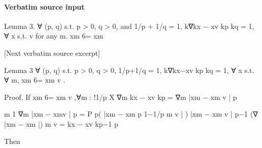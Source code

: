 \documentclass[10pt]{article}
\begin{document}
\paragraph{Verbatim source input}
\begin{ReviewVerbatim}
Lemma 3. ∀ (p, q) s.t. p > 0, q > 0, and 1/p + 1/q = 1, k∇kx − xv kp kq = 1, ∀ x s.t.
       v for any m.
xm 6= xm

[Next verbatim source excerpt]

Lemma 3 ∀ (p, q) s.t. p > 0, q > 0, 1/p+1/q = 1, k∇kx−xv kp kq = 1, ∀ x s.t. ∀ m, xm 6= xm
                                                                                         v .

Proof. If xm 6= xm
                 v ,∀m :
                                                                                  !1/p
                                                              X
                          ∇m kx − xv kp = ∇m                       |xm − xm
                                                                          v |
                                                                             p

                                                               m
                                                   1    ∇m |xm − xmv |
                                                                       p
                                               =      P
                                                   p(    |xm − xm  p 1−1/p
                                                             m  v | )
                                                   |xm − xm
                                                          v |
                                                              p−1 (∇ |xm − xm |)
                                                                    m       v
                                               =
                                                                   kx − xv kp−1
                                                                            p

Then


\end{ReviewVerbatim}
\end{document}
